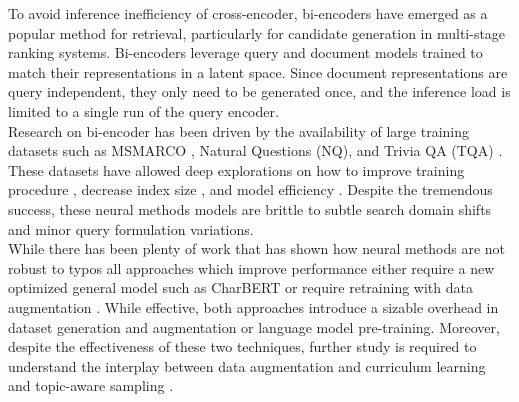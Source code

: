 To avoid inference inefficiency of cross-encoder, bi-encoders have emerged as a popular method for retrieval, particularly for candidate generation in multi-stage ranking systems. Bi-encoders leverage query and document models trained to match their representations in a latent space. Since document representations are query independent, they only need to be generated once, and the inference load is limited to a single run of the query encoder. \\
Research on bi-encoder has been driven by the availability of large training datasets such as MSMARCO \cite{Campos2016MSMA}, Natural Questions (NQ)\cite{Kwiatkowski2019NaturalQA}, and Trivia QA (TQA) \cite{Joshi2017TriviaQAAL}. These datasets have allowed deep explorations on how to improve training procedure \cite{Qu2021RocketQAAO}, decrease index size \cite{Yamada2021EfficientPR}, and model efficiency \cite{Khattab2020ColBERTEA}.  Despite the tremendous success, these neural methods models are brittle to subtle search domain shifts and minor query formulation variations\cite{Wu2021AreNR}.  \\
While there has been plenty of work that has shown how neural methods are not robust to typos \cite{Wu2021AreNR} \cite{Penha2021EvaluatingTR} \cite{Sidiropoulos2022OnTI} \cite{Sidiropoulos2022AnalysingTR} \cite{zhuang-zuccon-2021-dealing}  all approaches which improve performance either require a new optimized general model such as CharBERT \cite{Zhuang2022CharacterBERTAS} or require retraining with data augmentation \cite{zhuang-zuccon-2021-dealing}. While effective, both approaches introduce a sizable overhead in dataset generation and augmentation or language model pre-training. Moreover, despite the effectiveness of these two techniques, further study is required to understand the interplay between data augmentation and  curriculum learning \cite{Mao2022CurriculumCC} and topic-aware sampling \cite{Hofsttter2021EfficientlyTA}. \\
